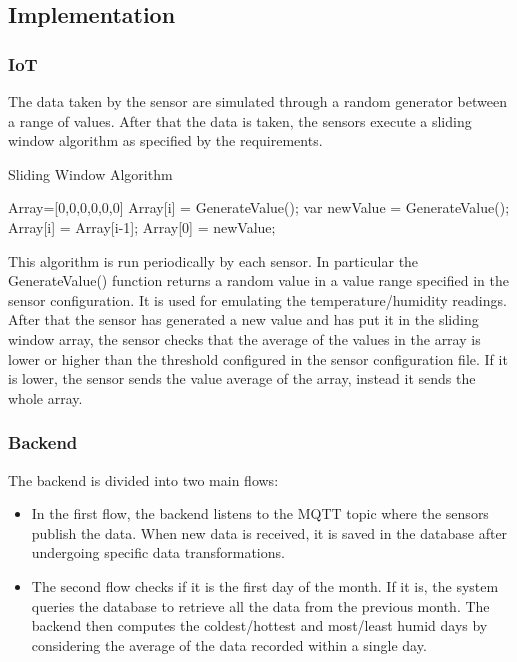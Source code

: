 \documentclass[11pt]{article}
\begin{document}
\subsection{Implementation}
\subsubsection{IoT }
The data taken by the sensor are simulated through a random generator between a range of values. After that the data is taken, the sensors execute a sliding window algorithm as specified by the requirements.
\begin{algorithm}
    \caption{Sliding Window Algorithm}\label{alg:cap}
    \begin{algorithmic}
            \State Array=[0,0,0,0,0,0]
                \State Array[i] = GenerateValue();
            \EndFor
        \ElsIf{}
            \State var newValue = GenerateValue();
                \State Array[i] = Array[i-1];
            \EndFor 
            \State Array[0] = newValue;
        \EndIf
    \end{algorithmic}
\end{algorithm}

This algorithm is run periodically by each sensor. In particular the GenerateValue() function returns a random value in a value range specified in the sensor configuration. It is used for emulating the temperature/humidity readings.
After that the sensor has generated a new value and has put it in the sliding window array, the sensor checks that the average of the values in the array is lower or higher than the threshold configured in the sensor configuration file.
If it is lower, the sensor sends the value average of the array, instead it sends the whole array.

\subsubsection{Backend}
The backend is divided into two main flows:
\begin{itemize}
    \item In the first flow, the backend listens to the MQTT topic where the sensors publish the data. When new data is received, it is saved in the database after undergoing specific data transformations.
    \item The second flow checks if it is the first day of the month. If it is, the system queries the database to retrieve all the data from the previous month. The backend then computes the coldest/hottest and most/least humid days by considering the average of the data recorded within a single day.
\end{itemize}
\end{document}

